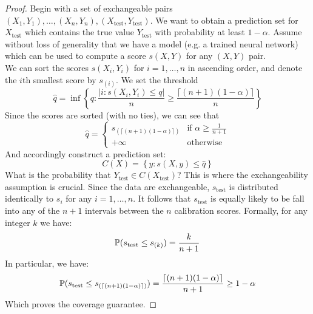 \documentclass[a4paper, 12pt]{article}
\begin{document}
\begin{proof}
    Begin with a set of exchangeable pairs $(X_1, Y_1), \ldots, (X_n, Y_n), (X_\text{test}, Y_\text{test})$. We
    want to obtain a prediction set for $X_{\text{test}}$ which contains the true value $Y_\text{test}$ with probability at least $1-\alpha$.
    Assume without loss of generality that we have a model (e.g. a trained neural network) which can be
    used to compute a score $s(X, Y)$ for any $(X, Y)$ pair. \\
    We can sort the scores $s(X_i, Y_i)$ for $i = 1, \ldots, n$ in ascending order, and denote the $i$th smallest score by $s_{(i)}$.
    We set the threshold
    \[\hat{q} = \inf \left\{ q: \frac{\left| i : s(X_i, Y_i) \leq q \right|}{n} \geq \frac{\lceil (n+1)(1-\alpha) \rceil }{n}\right\}\]
    Since the scores are sorted (with no ties), we can see that $$\hat{q} = \begin{cases}
            s_{(\lceil (n+1)(1-\alpha) \rceil)} & \text{if } \alpha \geq \frac{1}{n+1} \\
            +\infty                             & \text{otherwise }
        \end{cases}$$
    And accordingly construct a prediction set:
    \[C(X) = \left\{ y: s(X, y) \leq \hat{q} \right\}\]
    What is the probability that $Y_{\text{test}} \in C(X_{\text{test}})$? This
    is where the exchangeability assumption is crucial. Since the data are exchangeable,
    $s_{\text{test}}$ is distributed identically to $s_{i}$ for any $i = 1, \ldots, n$.
    It follows that $s_{\text{test}}$ is equally likely to be fall into any of the $n+1$ intervals between the $n$ calibration scores.
    Formally, for any integer $k$ we have:
    \[ \P(s_{\text{test}} \leq s_{(k)}) = \frac{k}{n+1} \]
    In particular, we have:
    \[ \P(s_{\text{test}} \leq s_{(\lceil (n+1)(1-\alpha) \rceil)}) = \frac{\lceil (n+1)(1-\alpha) \rceil}{n+1} \geq 1 - \alpha \]
    Which proves the coverage guarantee.
\end{proof}
\end{document}
